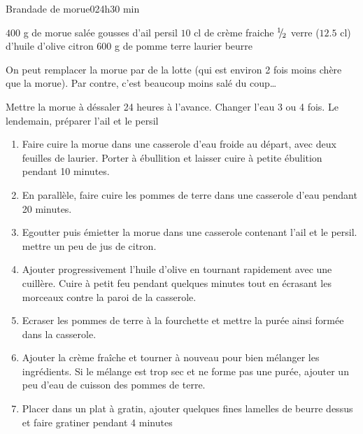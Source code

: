 \begin{recette}{Brandade de morue}{0}{24h}{30 min}
\begin{ingredients}
\ingredient $400$ g de morue salée
 gousses d'ail
\ingredient persil
\ingredient $10$ cl de crème fraiche
\ingredient ${{}^{1\!\!}/ _{\!2}}$ verre ($12.5$ cl) d'huile d'olive
 citron
\ingredient $600$ g de pomme terre
\ingredient laurier
\ingredient beurre
\end{ingredients}

\begin{remarque}
On peut remplacer la morue par de la lotte (qui est environ 2 fois moins chère que la morue). Par contre, c'est beaucoup moins salé du coup\dots
\end{remarque}


\begin{preparation}
\etape Mettre la morue à déssaler 24 heures à l'avance. Changer l'eau 3 ou 4 fois.
\etape Le lendemain, préparer l'ail et le persil
\end{preparation}

\begin{cuisson}
\begin{enumerate}
\item Faire cuire la morue dans une casserole d'eau froide au départ, avec deux feuilles de laurier. Porter à ébullition et laisser cuire à petite ébulition pendant 10 minutes.
\item En parallèle, faire cuire les pommes de terre dans une casserole d'eau pendant 20 minutes.
\item Egoutter puis émietter la morue dans une casserole contenant l'ail et le persil. mettre un peu de jus de citron.
\item Ajouter progressivement l'huile d'olive en tournant rapidement avec une cuillère. Cuire à petit feu pendant quelques minutes tout en écrasant les morceaux contre la paroi de la casserole.
\item Ecraser les pommes de terre à la fourchette et mettre la purée ainsi formée dans la casserole.
\item Ajouter la crème fraîche et tourner à nouveau pour bien mélanger les ingrédients. Si le mélange est trop sec et ne forme pas une purée, ajouter un peu d'eau de cuisson des pommes de terre.
\item Placer dans un plat à gratin, ajouter quelques fines lamelles de beurre dessus et faire gratiner pendant 4 minutes
\end{enumerate}
\end{cuisson}

\end{recette}

